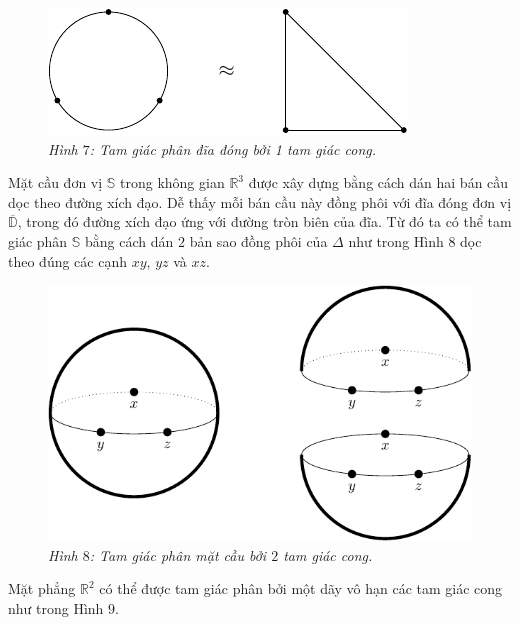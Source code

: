 \begin{multicols}{2}
\begin{figure}[H]
		\centering\captionsetup{labelformat=empty, justification=centering}
		\includegraphics[width=1\linewidth]{H7.pdf}
		\caption{\small\textit{\color{duongvaotoanhoc}Hình $7$: Tam giác phân đĩa đóng bởi 1 tam giác cong.}}
		\vspace*{-10pt}
	\end{figure}
	Mặt cầu đơn vị $\mathbb{S}$ trong không gian $\mathbb{R}^3$ được xây dựng bằng cách dán hai bán cầu dọc theo đường xích đạo. Dễ thấy mỗi bán cầu này đồng phôi với đĩa đóng đơn vị $\overline{\mathbb{D}}$, trong đó đường xích đạo ứng với đường tròn biên của đĩa. Từ đó ta có thể tam giác phân $\mathbb{S}$ bằng cách dán $2$ bản sao đồng phôi của $\Delta$ như trong Hình $8$ dọc theo đúng các cạnh $xy$, $yz$ và $xz$.
	\begin{figure}[H]
		\vspace*{-5pt}
		\centering\captionsetup{labelformat=empty, justification=centering}
		\includegraphics[width=1\linewidth]{H8.pdf}
		\caption{\small\textit{\color{duongvaotoanhoc}Hình $8$: Tam giác phân mặt cầu bởi $2$ tam giác cong.}}
		\vspace*{-5pt}
	\end{figure}
	Mặt phẳng $\mathbb{R}^2$ có thể được tam giác phân bởi một dãy vô hạn các tam giác cong như trong Hình $9$.
	\begin{figure}[H]

\end{figure}
\end{multicols}
